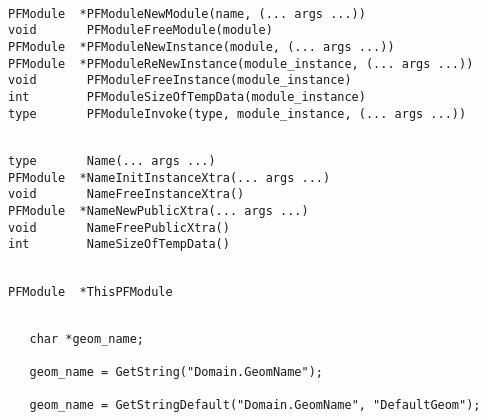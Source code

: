 {\newpage\clearpage
{}%
\begin{display}\begin{verbatim}

PFModule  *PFModuleNewModule(name, (... args ...))
void       PFModuleFreeModule(module)
PFModule  *PFModuleNewInstance(module, (... args ...))
PFModule  *PFModuleReNewInstance(module_instance, (... args ...))
void       PFModuleFreeInstance(module_instance)
int        PFModuleSizeOfTempData(module_instance)
type       PFModuleInvoke(type, module_instance, (... args ...))\end{verbatim}
\end{display}%
\lthtmlfigureZ
\lthtmlcheckvsize\clearpage}

{\newpage\clearpage
{}%
\begin{display}\begin{verbatim}

type       Name(... args ...)
PFModule  *NameInitInstanceXtra(... args ...)
void       NameFreeInstanceXtra()
PFModule  *NameNewPublicXtra(... args ...)
void       NameFreePublicXtra()
int        NameSizeOfTempData()\end{verbatim}
\end{display}%
\lthtmlfigureZ
\lthtmlcheckvsize\clearpage}

{\newpage\clearpage
{}%
\begin{display}\begin{verbatim}

PFModule  *ThisPFModule\end{verbatim}
\end{display}%
\lthtmlfigureZ
\lthtmlcheckvsize\clearpage}

{\newpage\clearpage
{}%
\begin{display}\begin{verbatim}

   char *geom_name;

   geom_name = GetString("Domain.GeomName");

   geom_name = GetStringDefault("Domain.GeomName", "DefaultGeom");\end{verbatim}
\end{display}%
\lthtmlfigureZ
\lthtmlcheckvsize\clearpage}

